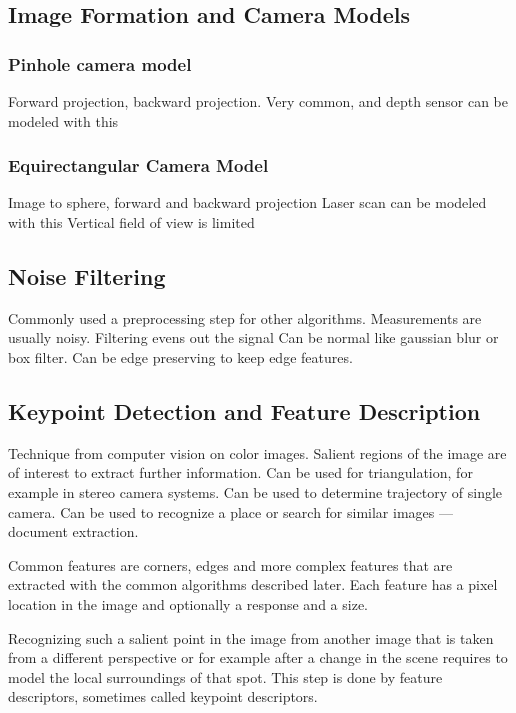 \subsection{Image Formation and Camera Models}

\subsubsection{Pinhole camera model}

Forward projection, backward projection.
Very common, and depth sensor can be modeled with this

\subsubsection{Equirectangular Camera Model}

Image to sphere, forward and backward projection
Laser scan can be modeled with this
Vertical field of view is limited

\subsection{Noise Filtering}

Commonly used a preprocessing step for other algorithms.
Measurements are usually noisy. Filtering evens out the signal
Can be normal like gaussian blur or box filter.
Can be edge preserving to keep edge features.

\subsection{Keypoint Detection and Feature Description}

Technique from computer vision on color images.
Salient regions of the image are of interest to extract further information.
Can be used for triangulation, for example in stereo camera systems.
Can be used to determine trajectory of single camera.
Can be used to recognize a place or search for similar images --- document extraction.

Common features are corners, edges and more complex features that are extracted with the common algorithms described later.
Each feature has a pixel location in the image and optionally a response and a size.

Recognizing such a salient point in the image from another image that is taken from a different perspective or for example after a change in the scene requires to model the local surroundings of that spot.
This step is done by feature descriptors, sometimes called keypoint descriptors.

